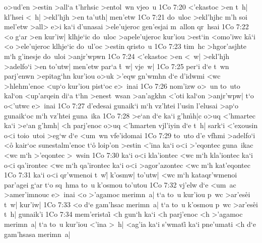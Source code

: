 o>ud'en
>estin
>all`a
t'hrhsic
>entol~wn
vjeo~u\bibvsend
\vs 1Co 7:20
<'ekastoc
>en
t~h|
kl'hsei
<~h|
>ekl'hjh
>en
ta'uth|
men'etw\bibvsend
\vs 1Co 7:21
do~uloc
>ekl'hjhc
m'h
soi
mel'etw
>all>
e>i
ka`i
d'unasai
>ele'ujeroc
gen'esjai
m~allon
qr~hsai\bibvsend
\vs 1Co 7:22
<o
g`ar
>en
kur'iw|
klhje`ic
do~uloc
>apele'ujeroc
kur'iou
>est`in
<omo'iwc
k\r{a}`i
<o
>ele'ujeroc
klhje`ic
do~ul'oc
>estin
qristo~u\bibvsend
\vs 1Co 7:23
tim~hc
>hgor'asjhte
m`h
g'inesje
do~uloi
>anjr'wpwn\bibvsend
\vs 1Co 7:24
<'ekastoc
>en
<~w|
>ekl'hjh
>adelfo`i
>en
to'utw|
men'etw
par`a
\r{t}~w|
vje~w|\bibvsend
\vs 1Co 7:25
per`i
d`e
t~wn
parj'enwn
>epitag`hn
kur'iou
o>uk
>'eqw
gn'wmhn
d`e
d'idwmi
<wc
>hlehm'enoc
<up`o
kur'iou
pist`oc
e>~inai\bibvsend
\vs 1Co 7:26
nom'izw
o>~un
to~uto
kal`on
<up'arqein
di`a
t`hn
>enest~wsan
>an'agkhn
<'oti
kal`on
>anjr'wpw|
t`o
o<'utwc
e>~inai\bibvsend
\vs 1Co 7:27
d'edesai
gunaik`i
m`h
vz'htei
l'usin
l'elusai
>ap`o
gunaik`oc
m`h
vz'htei
guna~ika\bibvsend
\vs 1Co 7:28
>e`an
d`e
ka`i
g'h\r{m}h|c
o>uq
<'hmartec
ka`i
>e`an
g'hmh|
<h
parj'enoc
o>uq
<'hmarten
vjl'iyin
d`e
t~h|
sark`i
<'exousin
o<i
toio~utoi
>eg`w
d`e
<um~wn
vfe'idomai\bibvsend
\vs 1Co 7:29
to~uto
d'e
vfhmi
>adelfo`i
<o\r{}
kair`oc
sunestalm'enoc
t`o\r{}
loip'on
>estin
<'ina
ka`i
o<i
>'eqontec
guna~ikac
<wc
m`h
>'eqontec
>~wsin\bibvsend
\vs 1Co 7:30
ka`i
o<i
kla'iontec
<wc
m`h
kla'iontec
ka`i
o<i
qa'irontec
<wc
m`h
qa'irontec
ka`i
o<i
>agor'azontec
<wc
m`h
kat'eqontec\bibvsend
\vs 1Co 7:31
ka`i
o<i
qr'wmenoi
t~w|\r{}
k'osmw|
to'utw|
<wc
m`h
kataqr'wmenoi
par'agei
g`ar
t`o
sq~hma
to~u
k'osmou
to'utou\bibvsend
\vs 1Co 7:32
vj'elw
d`e
<um~ac
>amer'imnouc
e>~inai
<o
>'agamoc
merimn~a|
t`a
to~u
kur'iou
p~wc
>ar'es\r{e}i
t~w|
kur'iw|\bibvsend
\vs 1Co 7:33
<o
d`e
gam'hsac
merimn~a|
t`a
to~u
k'osmou
p~wc
>ar'es\r{e}i
t~h|
gunaik'i\bibvsend
\vs 1Co 7:34
mem'eristai\r{}
<h
gun`h
ka`i
<h
parj'enoc
<h
>'agamoc
merimn~a|
t`a
to~u
kur'iou
<'ina
>~h|
<ag'ia
ka`i
s'wmati\r{}
ka`i
pne'umati
<h
d`e
gam'hsasa
merimn~a|
